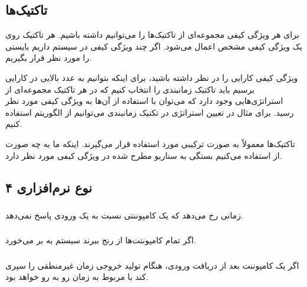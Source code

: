 \subsection{تاکتیک‌ها}

برای هر ویژگی کیفی مجموعه‌ای از تاکتیک‌ها را می‌توانیم داشته باشیم. هر تاکتیک
روی یک ویژگی کیفی مشخص اعمال می‌شود. اگر چند ویژگی کیفی در سیستم داریم بایستی
 را مورد نظر قرار بگیریم.

ویژگی کیفی کارایی را در نظر داشته باشید، برای اینکه بتوانیم به عدد بالایی در
کارایی برسیم باید تاکتیک زمانبندی را انتخاب کنیم که در هر تاکتیک مجموعه‌ای از
استراتژی‌هایی وجود دارد که می‌توان با استفاده از آن‌ها به ویژگی کیفی مورد نظر
رسید. برای مثال در تعیین استراتژی در تکنیک زمانبندی می‌توانیم از الگوریتم
 استفاده کنیم.

تاکتیک‌ها معمولاً به صورت ترکیبی مورد استفاده قرار می‌گیرند. اینکه ما به چه
صورت از  استفاده می‌کنیم بستگی به سناریو مطرح شده در ویژگی کیفی
مورد نظر دارد.

\subsection{۴ نوع  نرم‌افزاری}

\subsubsection{}

زمانی رخ می‌دهد که یک کامپوننتی نسبت به یک ورودی پاسخ نمی‌دهد.

\subsubsection{}

اگر تمام کامپوننت‌ها از  رنج ببرند سیستم به  بر می‌خورد.

\subsubsection{}

اگر یک کامپوننت بعد از دریافت ورودی، هنگام تولید خروجی زمان غیرمنطقی را سپری کند
با  مربوط به زمان رو به رو خواهد بود.

\subsubsection{}


